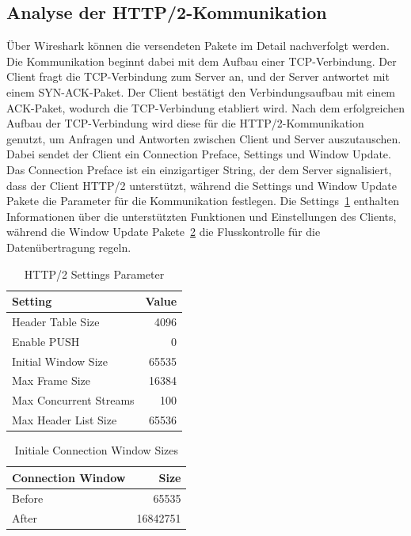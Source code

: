\FloatBarrier{}
\subsection{Analyse der HTTP/2-Kommunikation}

Über Wireshark können die versendeten Pakete im Detail nachverfolgt werden. Die Kommunikation beginnt dabei mit dem Aufbau einer TCP-Verbindung.
Der Client fragt die TCP-Verbindung zum Server an, und der Server antwortet mit einem SYN-ACK-Paket.
Der Client bestätigt den Verbindungsaufbau mit einem ACK-Paket, wodurch die TCP-Verbindung etabliert wird.
Nach dem erfolgreichen Aufbau der TCP-Verbindung wird diese für die HTTP/2-Kommunikation genutzt, um Anfragen und Antworten zwischen Client und Server auszutauschen.
Dabei sendet der Client ein Connection Preface, Settings und Window Update.
Das Connection Preface ist ein einzigartiger String, der dem Server signalisiert, dass der Client HTTP/2 unterstützt, während die Settings und Window Update Pakete die Parameter für die Kommunikation festlegen.
Die Settings~\ref{tab:http2_settings} enthalten Informationen über die unterstützten Funktionen und Einstellungen des Clients, während die Window Update Pakete~\ref{tab:http2_window_sizes} die Flusskontrolle für die Datenübertragung regeln.

\begin{table}[h]
    \centering
    \begin{tabular}{|l|r|}
        \hline
        \textbf{Setting} & \textbf{Value} \\ \hline
        Header Table Size & 4096 \\ \hline
        Enable PUSH & 0 \\ \hline
        Initial Window Size & 65535 \\ \hline
        Max Frame Size & 16384 \\ \hline
        Max Concurrent Streams & 100 \\ \hline
        Max Header List Size & 65536 \\ \hline
    \end{tabular}
    \caption{HTTP/2 Settings Parameter}\label{tab:http2_settings}
\end{table}

\begin{table}[h]
    \centering
    \begin{tabular}{|l|r|}
        \hline
        \textbf{Connection Window} & \textbf{Size} \\ \hline
        Before & 65535 \\ \hline
        After & 16842751 \\ \hline
    \end{tabular}
    \caption{Initiale Connection Window Sizes}\label{tab:http2_window_sizes}
\end{table}

